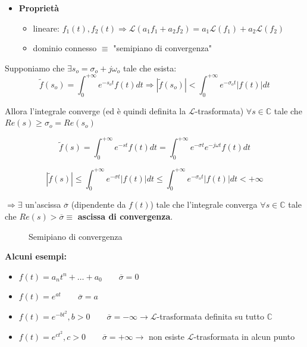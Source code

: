 \documentclass[11pt,a4paper]{report}
\begin{document}
\begin{itemize}
    \item \textbf{Proprietà}
    \begin{itemize}
        \item lineare: $f_1(t), f_2(t) \Rightarrow \mathcal{L}(a_1 f_1 + a_2 f_2) = a_1 \mathcal{L}(f_1) + a_2 \mathcal{L}(f_2)$
        \item dominio connesso $\equiv$ "semipiano di convergenza"
    \end{itemize}
\end{itemize}

Supponiamo che $\exists s_o = \sigma_o + j\omega_o$ tale che esista:
\[ \tilde{f}(s_o) = \int_0^{+\infty} e^{-s_o t} f(t) dt \Rightarrow |\tilde{f}(s_o)| < \int_0^{+\infty} e^{-\sigma_o t} |f(t)| dt \]

Allora l'integrale converge (ed è quindi definita la $\mathcal{L}$-trasformata) $\forall s \in \mathbb{C}$ tale che $Re(s) \geq \sigma_o = Re(s_o)$

\[ \tilde{f}(s) = \int_0^{+\infty} e^{-st} f(t) dt = \int_0^{+\infty} e^{-\sigma t} e^{-j\omega t} f(t) dt \]


\[ |\tilde{f}(s)| \leq \int_0^{+\infty} e^{-\sigma t} |f(t)| dt \leq \int_0^{+\infty} e^{-\sigma_o t} |f(t)| dt < +\infty \]

$\Rightarrow \exists$ un'ascissa $\overline{\sigma}$ (dipendente da $f(t)$) tale che l'integrale converga $\forall s \in \mathbb{C}$ tale che $Re(s) > \overline{\sigma} \equiv$ \textbf{ascissa di convergenza}.

\begin{figure}[H]
    \centering
    \caption{Semipiano di convergenza}
\end{figure}

\textbf{Alcuni esempi:}
\begin{itemize}
    \item $f(t) = a_n t^n + \dots + a_0 \qquad \overline{\sigma} = 0$
    \item $f(t) = e^{at} \qquad \overline{\sigma} = a$
    \item $f(t) = e^{-bt^2}, b > 0 \qquad \overline{\sigma} = -\infty \rightarrow \mathcal{L}$-trasformata definita su tutto $\mathbb{C}$
    \item $f(t) = e^{ct^2}, c > 0 \qquad \overline{\sigma} = +\infty \rightarrow$ non esiste $\mathcal{L}$-trasformata in alcun punto
\end{itemize}
\end{document}
